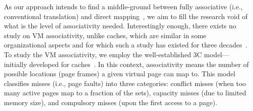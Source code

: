 As our approach intends to find a middle-ground between fully associative (i.e., conventional translation) and direct mapping~\cite{picorel:near-memory, haria:devirtualizing}, we aim to fill the research void of what is the level of associativity needed. Interestingly enough, there exists no study on VM associativity, unlike caches, which are similar in some organizational aspects and for which such a study has existed for three decades~\cite{hill:aspects}. To study the VM associativity, we employ the well-established 3C model---initially developed for caches~\cite{hill:aspects}. In this context, associativity means the number of possible locations (page frames) a given virtual page can map to. This model classifies misses (i.e., page faults) into three categories: conflict misses (when too many active pages map to a fraction of the sets), capacity misses (due to limited memory size), and compulsory misses (upon the first access to a page). 





